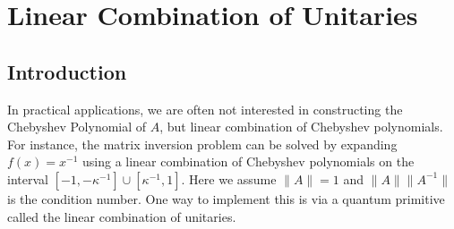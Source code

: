 \documentclass[12pt, oneside]{book}
\theoremstyle{definition}
\theoremstyle{definition}
\theoremstyle{remark}
\begin{document}
\chapter{Linear Combination of Unitaries}
\section{Introduction}
In practical applications, we are often not interested in constructing the Chebyshev Polynomial of $A$, but linear combination of Chebyshev polynomials. For instance, the matrix inversion problem can be solved by expanding $f(x)=x^{-1}$ using a linear combination of Chebyshev polynomials on the interval $[-1,-\kappa^{-1}] \cup [\kappa^{-1},1]$. Here we assume $\|A\|=1$ and $\|A\|\|A^{-1}\|$ is the condition number. One way to implement this is via a quantum primitive called the linear combination of unitaries.
\end{document}
